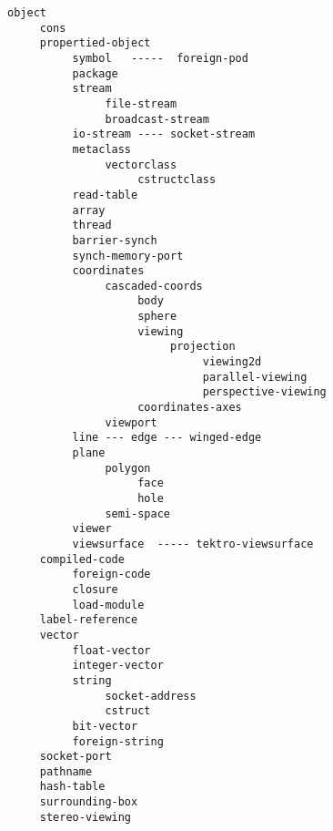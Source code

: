 {\newpage
\clearpage
\samepage 
\begin{figure}

\end{figure}
}

{\newpage
\clearpage
\samepage 
}

{\newpage
\clearpage
\samepage 
\begin{figure}[hb]
\begin{center}
\end{center}

\end{figure}
}

{\newpage
\clearpage
\samepage 
\begin{figure}[hbt]
\begin{center}
\end{center}

\end{figure}
}

{\newpage
\clearpage
\samepage 
\begin{figure}\small
\begin{verbatim}object
     cons
     propertied-object
          symbol   -----  foreign-pod
          package
          stream
               file-stream
               broadcast-stream
          io-stream ---- socket-stream
          metaclass
               vectorclass
                    cstructclass
          read-table
          array
          thread
          barrier-synch
          synch-memory-port
          coordinates
               cascaded-coords
                    body
                    sphere
                    viewing
                         projection
                              viewing2d
                              parallel-viewing
                              perspective-viewing
                    coordinates-axes
               viewport
          line --- edge --- winged-edge
          plane
               polygon
                    face
                    hole
               semi-space
          viewer
          viewsurface  ----- tektro-viewsurface
     compiled-code
          foreign-code
          closure
          load-module
     label-reference
     vector
          float-vector
          integer-vector
          string
               socket-address
               cstruct
          bit-vector
          foreign-string
     socket-port
     pathname
     hash-table
     surrounding-box
     stereo-viewing\end{verbatim}
\normalsize

\end{figure}
}

